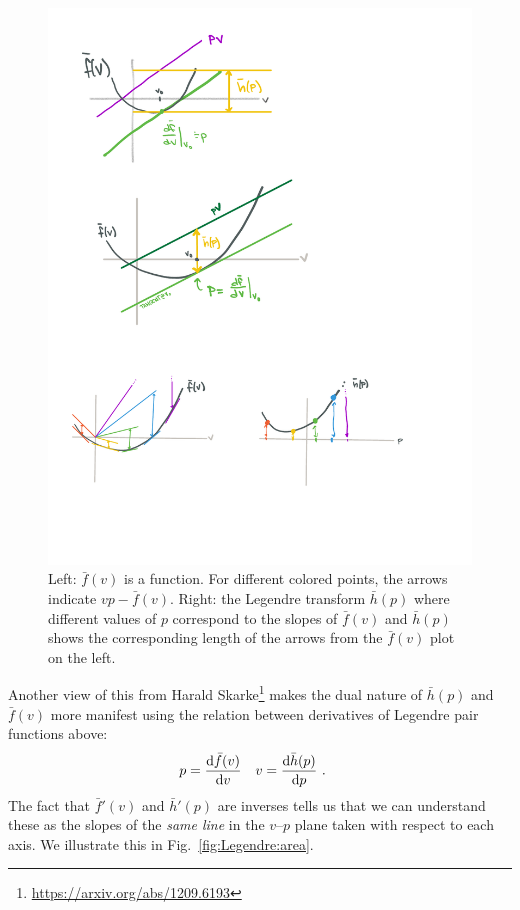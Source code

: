 \begin{figure}[tb]
    \centering
    \includegraphics[width=\linewidth]{figures/LegendreLegendre.pdf}
    \caption{Left: $\bar f(v)$ is a function. For different colored points, the arrows indicate $vp-\bar f(v)$. Right: the Legendre transform $\bar h(p)$ where different values of $p$ correspond to the slopes of $\bar f(v)$ and $\bar h(p)$ shows the corresponding length of the arrows from the $\bar f(v)$ plot on the left.}
    \label{fig:Legendre:plot}
\end{figure}

Another view of this from Harald Skarke\footnote{\url{https://arxiv.org/abs/1209.6193}} makes the dual nature of $\bar h(p)$ and $\bar f(v)$ more manifest using the relation between derivatives of Legendre pair functions above:
\begin{align}
    p &= \frac{ \operatorname{d}\mkern-3mu^{}\mkern-1mu{\bar f}(v) }{ \operatorname{d}\mkern-3mu^{}\mkern-1mu{v} }
    &
    v &= \frac{ \operatorname{d}\mkern-3mu^{}\mkern-1mu{\bar h}(p) }{ \operatorname{d}\mkern-3mu^{}\mkern-1mu{p} }
    \label{eq:p:v:as:derivatives}
    \ .
\end{align}
The fact that $\bar f'(v)$ and $\bar h'(p)$ are inverses tells us that we can understand these as the slopes of the \emph{same line} in the $v$--$p$ plane taken with respect to each axis. We illustrate this in Fig.~\ref{fig:Legendre:area}.

